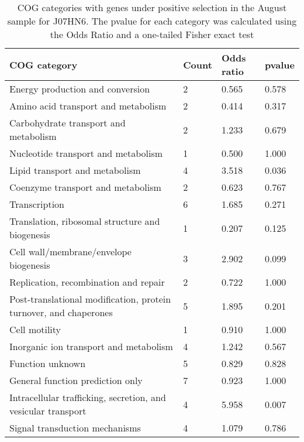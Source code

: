 \begin{table}[hb]
\footnotesize 
	\tabcolsep=0.11cm 
\caption{COG categories with genes under positive selection in the August sample for J07HN6. The pvalue for each category was calculated using the Odds Ratio and a one-tailed Fisher exact test} 
\begin{tabularx}{\textwidth}{L{6cm}R{2cm}R{2cm}R{2cm}} 
\hline 
\textbf{COG category} & \textbf{Count} & \textbf{Odds ratio} & \textbf{pvalue} \\ 
\hline 
Energy production and conversion & 2 & 0.565 & 0.578 \\ 
Amino acid transport and metabolism & 2 & 0.414 & 0.317 \\ 
Carbohydrate transport and metabolism & 2 & 1.233 & 0.679 \\ 
Nucleotide transport and metabolism & 1 & 0.500 & 1.000 \\ 
Lipid transport and metabolism & 4 & 3.518 & 0.036 \\ 
Coenzyme transport and metabolism & 2 & 0.623 & 0.767 \\ 
Transcription & 6 & 1.685 & 0.271 \\ 
Translation, ribosomal structure and biogenesis & 1 & 0.207 & 0.125 \\ 
Cell wall/membrane/envelope biogenesis & 3 & 2.902 & 0.099 \\ 
Replication, recombination and repair & 2 & 0.722 & 1.000 \\ 
Post-translational modification, protein turnover, and chaperones & 5 & 1.895 & 0.201 \\ 
Cell motility & 1 & 0.910 & 1.000 \\ 
Inorganic ion transport and metabolism & 4 & 1.242 & 0.567 \\ 
Function unknown & 5 & 0.829 & 0.828 \\ 
General function prediction only & 7 & 0.923 & 1.000 \\ 
Intracellular trafficking, secretion, and vesicular transport & 4 & 5.958 & 0.007 \\ 
Signal transduction mechanisms & 4 & 1.079 & 0.786 \\ 
\end{tabularx} 
\label{August_COG_Selection_J07HN6} 
 \end{table} 

